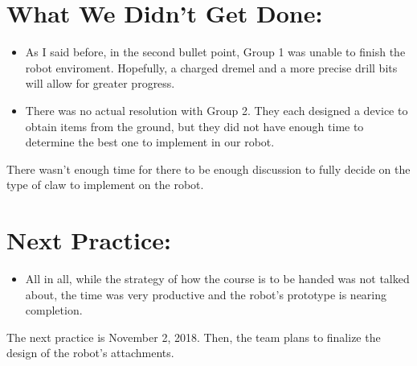 \documentclass[12pt]{article}
\begin{document}

\section{What We Didn't Get Done:} %
\begin{itemize}
    \item As I said before, in the second bullet point, Group 1 was unable to finish the robot enviroment.  Hopefully, a charged dremel and a more precise drill bits will allow for greater progress. 
    \item There was no actual resolution with Group 2.  They each designed a device to obtain items from the ground, but they did not have enough time to determine the best one to implement in our robot.
\end{itemize}

There wasn't enough time for there to be enough discussion to fully decide on the type of claw to implement on the robot.

\section{Next Practice:}
\begin{itemize}
    \item All in all, while the strategy of how the course is to be handed was not talked about, the time was very productive and the robot's prototype is nearing completion.  
\end{itemize}

The next practice is November 2, 2018.  Then, the team plans to finalize the design of the robot's attachments.

\newpage
\setcounter{section}{0}
\end{document}
